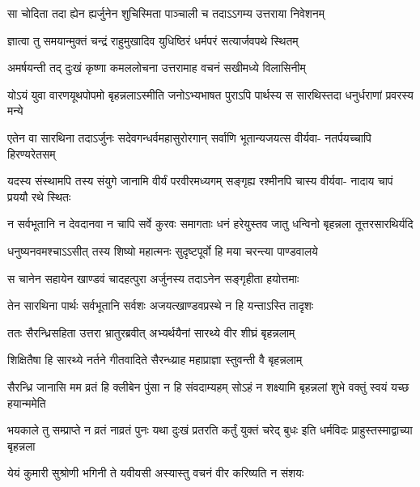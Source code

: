 
\twolineshloka
{सा चोदिता तदा ह्येन ह्यर्जुनेन शुचिस्मिता}
{पाञ्चाली च तदाऽऽगम्य उत्तराया निवेशनम्}


\twolineshloka
{ज्ञात्वा तु समयान्मुक्तं चन्द्रं राहुमुखादिव}
{युधिष्ठिरं धर्मपरं सत्यार्जवपथे स्थितम्}


\twolineshloka
{अमर्षयन्ती तद् दुःखं कृष्णा कमललोचना}
{उत्तरामाह वचनं सखीमध्ये विलासिनीम्}


\fourlineindentedshloka
{योऽयं युवा वारणयूथपोपमो}
{बृहन्नलाऽस्मीति जनोऽभ्यभाषत}
{पुराऽपि पार्थस्य स सारथिस्तदा}
{धनुर्धराणां प्रवरस्य मन्ये}


\fourlineindentedshloka
{एतेन वा सारथिना तदाऽर्जुनः}
{सदेवगन्धर्वमहासुरोरगान्}
{सर्वाणि भूतान्यजयत्स वीर्यवा-}
{नतर्पयच्चापि हिरण्यरेतसम्}


\fourlineindentedshloka
{यदस्य संस्थामपि तस्य संयुगे}
{जानामि वीर्यं परवीरमध्यगम्}
{सङ्गृह्य रश्मीनपि चास्य वीर्यवा-}
{नादाय चापं प्रययौ रथे स्थितः}


\fourlineindentedshloka
{न सर्वभूतानि न देवदानवा}
{न चापि सर्वे कुरवः समागताः}
{धनं हरेयुस्तव जातु धन्विनो}
{बृहन्नला तूत्तरसारथिर्यदि}


\twolineshloka
{धनुष्यनवमश्चाऽऽसीत् तस्य शिष्यो महात्मनः}
{सुदृष्टपूर्वो हि मया चरन्त्या पाण्डवालये}


\twolineshloka
{स चानेन सहायेन खाण्डवं चादहत्पुरा}
{अर्जुनस्य तदाऽनेन सङ्गृहीता हयोत्तमाः}


\twolineshloka
{तेन सारथिना पार्थः सर्वभूतानि सर्वशः}
{अजयत्खाण्डवप्रस्थे न हि यन्ताऽस्ति तादृशः}



\twolineshloka
{ततः सैरन्ध्रिसहिता उत्तरा भ्रातुरब्रवीत्}
{अभ्यर्थयैनां सारथ्ये वीर शीघ्रं बृहन्नलाम्}


\twolineshloka
{शिक्षितैषा हि सारथ्ये नर्तने गीतवादिते}
{सैरन्ध्य्राह महाप्राज्ञा स्तुवन्ती वै बृहन्नलाम्}




\fourlineindentedshloka
{सैरन्ध्रि जानासि मम व्रतं हि}
{क्लीबेन पुंसा न हि संवदाम्यहम्}
{सोऽहं न शक्ष्यामि बृहन्नलां शुभे}
{वक्तुं स्वयं यच्छ हयान्ममेति}




\threelineshloka
{भयकाले तु सम्प्राप्ते न व्रतं नाव्रतं पुनः}
{यथा दुःखं प्रतरति कर्तुं युक्तं चरेद् बुधः}
{इति धर्मविदः प्राहुस्तस्माद्वाच्या बृहन्नला}


\twolineshloka
{येयं कुमारी सुश्रोणी भगिनी ते यवीयसी}
{अस्यास्तु वचनं वीर करिष्यति न संशयः}


